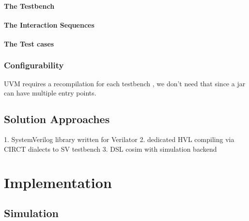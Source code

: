\documentclass[12pt]{book}
\begin{document}
\subsubsection{The Testbench}

\subsubsection{The Interaction Sequences}

\subsubsection{The Test cases}

\subsection{Configurability} %

UVM requires a recompilation for each testbench \cite{salemi2013uvm}, we don't need that since a jar can have multiple entry points.

\section{Solution Approaches} %

1. SystemVerilog library written for Verilator
2. dedicated HVL compiling via CIRCT dialects to SV testbench
3. DSL cosim with simulation backend




\chapter{Implementation} %

\section{Simulation} %
\end{document}
